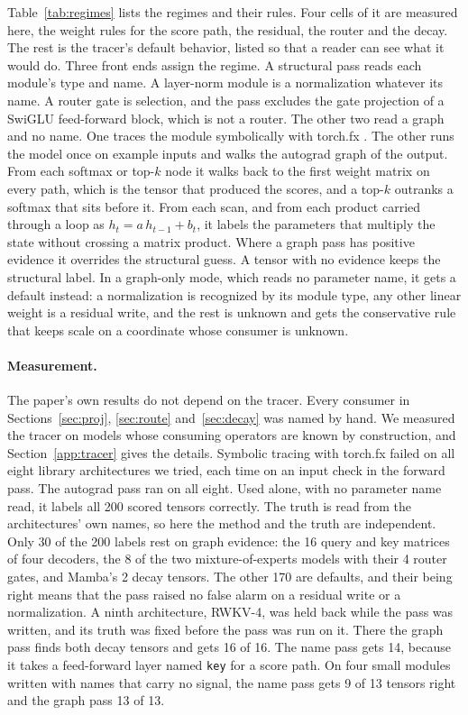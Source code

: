 \documentclass[journal,onecolumn]{IEEEtran}
\begin{document}
Table~\ref{tab:regimes} lists the regimes and their rules. Four cells of it are measured here,
the weight rules for the score path, the residual, the router and the decay. The rest is the
tracer's default behavior, listed so that a reader can see what it would do. Three front ends assign the regime. A
structural pass reads each module's type and name. A layer-norm module is a normalization whatever
its name. A router gate is selection, and the pass excludes the gate projection of a SwiGLU
feed-forward block, which is not a router. The other two read a graph and no name. One traces the
module symbolically with torch.fx \citep{reed2022torchfx}. The other runs the model once on example
inputs and walks the autograd graph of the output. From each softmax or top-$k$ node it walks back
to the first weight matrix on every path, which is the tensor that produced the scores, and a
top-$k$ outranks a softmax that sits before it. From each scan, and from each product carried
through a loop as $h_t = a\,h_{t-1} + b_t$, it labels the parameters that multiply the state
without crossing a matrix product. Where a graph pass has positive evidence it overrides the
structural guess. A tensor with no evidence keeps the structural label. In a graph-only mode,
which reads no parameter name, it gets a default instead: a normalization is recognized by its
module type, any other linear weight is a residual write, and the rest is unknown and gets the
conservative rule that keeps scale on a coordinate whose consumer is unknown.

\paragraph{Measurement.} The paper's own results do not depend on the tracer. Every consumer in
Sections~\ref{sec:proj}, \ref{sec:route} and~\ref{sec:decay} was named by hand. We measured the
tracer on models whose consuming operators are known by construction, and
Section~\ref{app:tracer} gives the details. Symbolic tracing with torch.fx failed on all eight
library architectures we tried, each time on an input check in the forward pass. The autograd
pass ran on all eight. Used alone, with no parameter name read, it labels all 200 scored tensors
correctly. The truth is read from the architectures' own names, so here the method and the truth
are independent. Only 30 of the 200 labels rest on graph evidence: the 16 query and key matrices
of four decoders, the 8 of the two mixture-of-experts models with their 4 router gates, and
Mamba's 2 decay tensors. The other 170 are defaults, and their being right means that the pass
raised no false alarm on a residual write or a normalization. A ninth architecture, RWKV-4, was
held back while the pass was written, and its truth was fixed before the pass was run on it.
There the graph pass finds both decay tensors and gets 16 of 16. The name pass gets 14, because
it takes a feed-forward layer named \texttt{key} for a score path. On four small modules written
with names that carry no signal, the name pass gets 9 of 13 tensors right and the graph pass 13
of 13.
\end{document}
